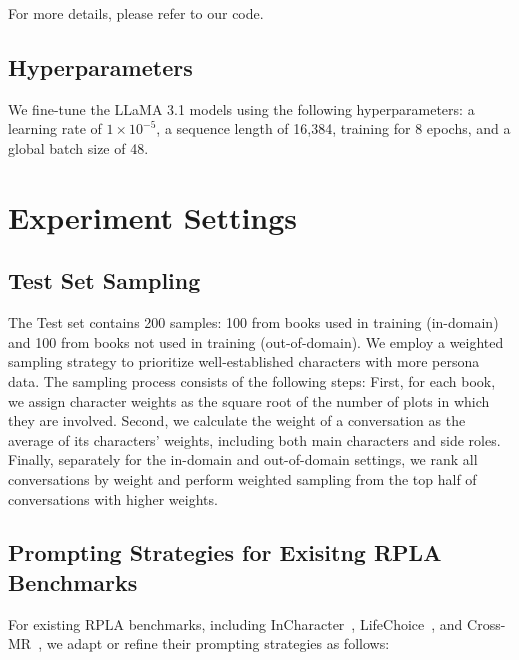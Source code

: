 For more details, please refer to our code. 


\subsection{Hyperparameters}

We fine-tune the LLaMA 3.1 models using the following hyperparameters: a learning rate of \(1 \times 10^{-5}\), a sequence length of 16,384, training for 8 epochs, and a global batch size of 48.



\section{Experiment Settings}
\label{sec:exp_setting}

\subsection{Test Set Sampling}

The \method Test set contains 200 samples: 
100 from books used in \method training (in-domain) and 100 from books not used in training (out-of-domain). 
We employ a weighted sampling strategy to prioritize well-established characters with more persona data. The sampling process consists of the following steps:
First, for each book, we assign character weights as the square root of the number of plots in which they are involved.
Second, we calculate the weight of a conversation as the average of its characters’ weights, including both main characters and side roles. Finally, separately for the in-domain and out-of-domain settings, we rank all conversations by weight and perform weighted sampling from the top half of conversations with higher weights.

\subsection{Prompting Strategies for Exisitng RPLA Benchmarks}

For existing RPLA benchmarks, including InCharacter~\citep{wang2024incharacter}, LifeChoice~\citep{xu2024character}, and Cross-MR~\citep{yuan2024evaluating}, we adapt or refine their prompting strategies as follows:

